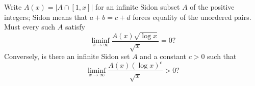 Write $A(x)=|A\cap[1,x]|$ for an infinite Sidon subset $A$ of the positive integers; Sidon means that $a+b=c+d$ forces equality of the unordered pairs. Must every such $A$ satisfy
\[\liminf_{x\to\infty}\frac{A(x)\sqrt{\log x}}{\sqrt x}=0?\]
Conversely, is there an infinite Sidon set $A$ and a constant $c>0$ such that
\[\liminf_{x\to\infty}\frac{A(x)(\log x)^c}{\sqrt x}>0?\]
